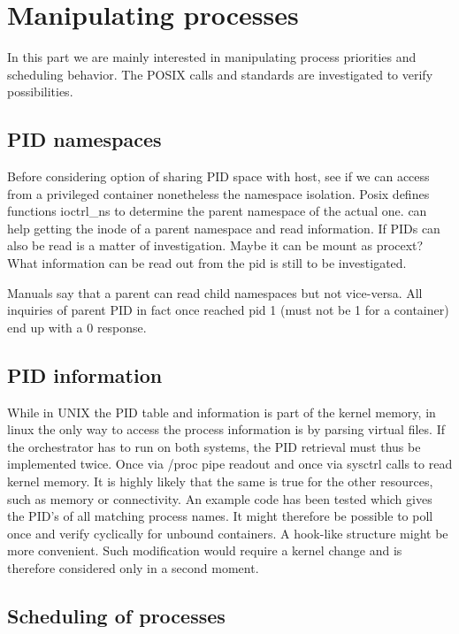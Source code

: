 \documentclass[]{scrartcl}
\begin{document}

\section{Manipulating processes}
\label{sec:mgmttest}

In this part we are mainly interested in manipulating process priorities and scheduling behavior. 
The POSIX calls and standards are investigated to verify possibilities.

\subsection{PID namespaces}

Before considering option of sharing PID space with host, see if we can access from a privileged container nonetheless the namespace isolation. 
Posix defines functions ioctrl\_ns to determine the parent namespace of the actual one. can help getting the inode of a parent namespace and read information. 
If PIDs can also be read is a matter of investigation. Maybe it can be mount as \/procext?
What information can be read out from the pid is still to be investigated.

Manuals say that a parent can read child namespaces but not vice-versa. All inquiries of parent PID in fact once reached pid 1 (must not be 1 for a container) end up with a 0 response.

\subsection{PID information}
\label{sub:pidinf}

While in UNIX the PID table and information is part of the kernel memory, in linux the only way to access the process information is by parsing virtual files. 
If the orchestrator has to run on both systems, the PID retrieval must thus be implemented twice. Once via /proc pipe readout and once via sysctrl calls to read kernel memory.
It is highly likely that the same is true for the other resources, such as memory or connectivity. 
An example code has been tested which gives the PID's of all matching process names. 
It might therefore be possible to poll once and verify cyclically for unbound containers. 
A hook-like structure might be more convenient. Such modification would require a kernel change and is therefore considered only in a second moment.

\subsection{Scheduling of processes}
\end{document}
